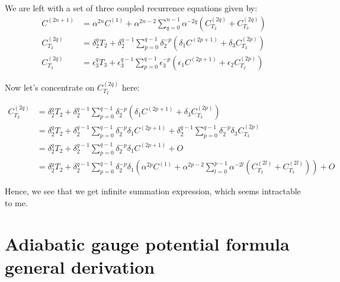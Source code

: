 \documentclass[11pt,a4paper]{article}
\begin{document}
We are left with a set of three coupled recurrence equations given by:
\begin{equation}
\boxed{
\begin{aligned}
C^{(2n+1)}&= \alpha^{2n} C^{(1)} +\alpha^{2n-2} \sum_{q=0}^{n-1} \alpha^{-2q} (C^{(2q)}_{T_2} + C^{(2q)}_{T_3}  ) \\
C^{(2q)}_{T_2} &= \delta^{q}_2 T_2 +  \delta_2^{q-1} \sum_{p=0}^{q-1} \delta_2^{-p}   (\delta_1 C^{(2p+1)} + \delta_3  C^{(2p)}_{T_3})\\
C^{(2q)}_{T_3} &= \epsilon_3^{q} T_3 +  \epsilon_3^{q-1} \sum_{p=0}^{q-1}\epsilon_3^{-p} (\epsilon_1 C^{(2p+1)} + \epsilon_2  C^{(2p)}_{T_2}) 
\end{aligned}
}
\end{equation}

Now let's concentrate on $C^{(2q)}_{T_2}$ here:

\begin{align}
C^{(2q)}_{T_2} &= \delta^{q}_2 T_2 +  \delta_2^{q-1} \sum_{p=0}^{q-1} \delta_2^{-p}   (\delta_1 C^{(2p+1)} + \delta_3  C^{(2p)}_{T_3})\\
 &= \delta^{q}_2 T_2 +  \delta_2^{q-1} \sum_{p=0}^{q-1} \delta_2^{-p}    \delta_1 C^{(2p+1)} + \delta_2^{q-1}  \sum_{p=0}^{q-1} \delta_2^{-p}  \delta_3  C^{(2p)}_{T_3}\\
 &= \delta^{q}_2 T_2 +  \delta_2^{q-1} \sum_{p=0}^{q-1} \delta_2^{-p}    \delta_1 C^{(2p+1)} + O\\
& =\delta^{q}_2 T_2 +  \delta_2^{q-1} \sum_{p=0}^{q-1} \delta_2^{-p}   \delta_1 ( \alpha^{2p} C^{(1)} +\alpha^{2p-2} \sum_{l=0}^{p-1} \alpha^{-2l} (C^{(2l)}_{T_2} + C^{(2l)}_{T_3})) + O 
\end{align}

Hence, we see that we get infinite summation expression, which seems intractable to me.%


\section{Adiabatic gauge potential formula general derivation}\label{sec.gen_derivation}
\end{document}
